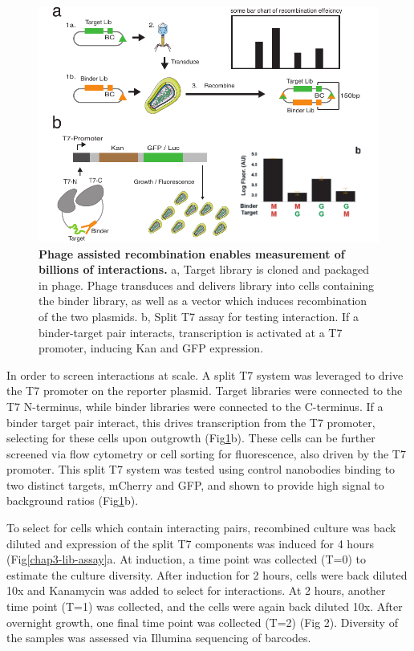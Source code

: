 \begin{figure}[t]
\includegraphics[width=\textwidth]{figures/chapter3/20190621_fig2_recombine_and_t7.pdf}
\caption[Phage assisted recombination enables measurement of billions of interactions]{\textbf{Phage assisted recombination enables measurement of billions of interactions.}
a, Target library is cloned and packaged in phage. Phage transduces and delivers library into cells containing the binder library, as well as a vector which induces recombination of the two plasmids.  b, Split T7 assay for testing interaction. If a binder-target pair interacts, transcription is activated at a T7 promoter, inducing Kan and GFP expression.
\label{chap3-recombine-T7}}
\end{figure}

In order to screen interactions at scale. A split T7 system was leveraged\cite{Pu2017-zo} to drive the T7 promoter on the reporter plasmid. Target libraries were connected to the T7 N-terminus, while binder libraries were connected to the C-terminus. If a binder target pair interact, this drives transcription from the T7 promoter, selecting for these cells upon outgrowth (Fig\ref{chap3-recombine-T7}b). These cells can be further screened via flow cytometry or cell sorting for fluorescence, also driven by the T7 promoter. This split T7 system was tested using control nanobodies binding to two distinct targets, mCherry and GFP, and shown to provide high signal to background ratios (Fig\ref{chap3-recombine-T7}b). 

To select for cells which contain interacting pairs, recombined culture was back diluted and expression of the split T7 components was induced for 4 hours (Fig\ref{chap3-lib-assay}a. At induction, a time point was collected (T=0) to estimate the culture diversity. After induction for 2 hours, cells were back diluted 10x and Kanamycin was added to select for interactions. At 2 hours, another time point (T=1) was collected, and the cells were again back diluted 10x. After overnight growth, one final time point was collected (T=2) (Fig 2). Diversity of the samples was assessed via Illumina sequencing of barcodes. 

